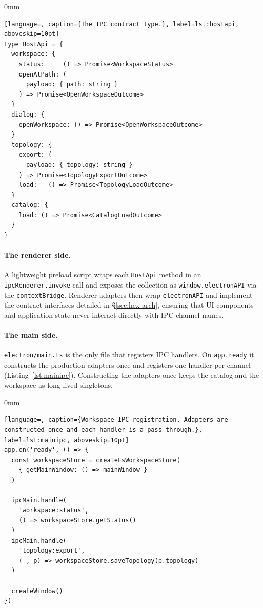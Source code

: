 \begin{addmargin}[0mm]{0mm}
\begin{lstlisting}[language=, caption={The IPC contract type.}, label=lst:hostapi, aboveskip=10pt]
type HostApi = {
  workspace: {
    status:     () => Promise<WorkspaceStatus>
    openAtPath: (
      payload: { path: string }
    ) => Promise<OpenWorkspaceOutcome>
  }
  dialog: {
    openWorkspace: () => Promise<OpenWorkspaceOutcome>
  }
  topology: {
    export: (
      payload: { topology: string }
    ) => Promise<TopologyExportOutcome>
    load:   () => Promise<TopologyLoadOutcome>
  }
  catalog: {
    load: () => Promise<CatalogLoadOutcome>
  }
}
\end{lstlisting}
\end{addmargin}

\paragraph{The renderer side.}
A lightweight preload script wraps each \texttt{HostApi} method in an \texttt{ipcRenderer.invoke} call and exposes the collection as \texttt{window.electronAPI} via the \texttt{contextBridge}. Renderer adapters then wrap \texttt{electronAPI} and implement the contract interfaces detailed in \S\ref{sec:hex-arch}, ensuring that UI components and application state never interact directly with IPC channel names.

\paragraph{The main side.}
\texttt{electron/main.ts} is the only file that registers IPC handlers. On \texttt{app.ready} it constructs the production adapters once and registers one handler per channel (Listing~\ref{lst:mainipc}). Constructing the adapters once keeps the catalog and the workspace as long-lived singletons.

\begin{addmargin}[0mm]{0mm}
\begin{lstlisting}[language=, caption={Workspace IPC registration. Adapters are constructed once and each handler is a pass-through.}, label=lst:mainipc, aboveskip=10pt]
app.on('ready', () => {
  const workspaceStore = createFsWorkspaceStore(
    { getMainWindow: () => mainWindow }
  )

  ipcMain.handle(
    'workspace:status',     
    () => workspaceStore.getStatus()
  )
  ipcMain.handle(
    'topology:export',      
    (_, p) => workspaceStore.saveTopology(p.topology)
  )

  createWindow()
})
\end{lstlisting}
\end{addmargin}


